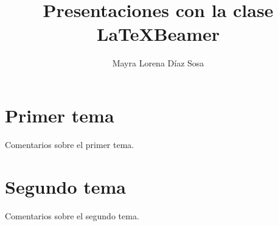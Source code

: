 \documentclass[spanish]{beamer}
\title{Presentaciones con la clase \LaTeX Beamer}
\author{Mayra Lorena Díaz Sosa}
\institute{FES Acatlán, UNAM}
\date{}
\begin{document}
\frame{\titlepage} %
\frame{\tableofcontents} %
\section{Primer tema}%
\begin{frame}
Comentarios sobre el primer tema.
\end{frame}%
\section{Segundo tema}%
\begin{frame}
Comentarios sobre el segundo tema.
\end{frame}%
\end{document}
